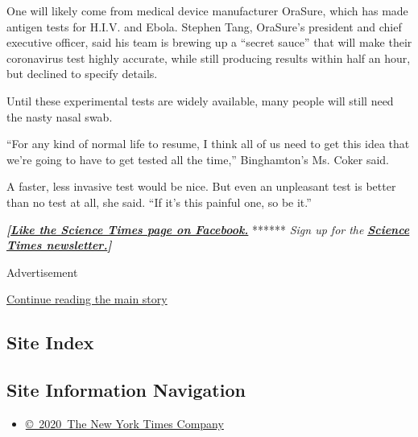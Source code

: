 One will likely come from medical device manufacturer OraSure, which has
made antigen tests for H.I.V. and Ebola. Stephen Tang, OraSure's
president and chief executive officer, said his team is brewing up a
``secret sauce'' that will make their coronavirus test highly accurate,
while still producing results within half an hour, but declined to
specify details.

Until these experimental tests are widely available, many people will
still need the nasty nasal swab.

``For any kind of normal life to resume, I think all of us need to get
this idea that we're going to have to get tested all the time,''
Binghamton's Ms. Coker said.

A faster, less invasive test would be nice. But even an unpleasant test
is better than no test at all, she said. ``If it's this painful one, so
be it.''

\textbf{\emph{{[}}\href{http://on.fb.me/1paTQ1h}{\emph{Like the Science
Times page on Facebook.}}} ****** \emph{\textbar{} Sign up for the}
\textbf{\href{http://nyti.ms/1MbHaRU}{\emph{Science Times
newsletter.}}\emph{{]}}}

Advertisement

\protect\hyperlink{after-bottom}{Continue reading the main story}

\hypertarget{site-index}{%
\subsection{Site Index}\label{site-index}}

\hypertarget{site-information-navigation}{%
\subsection{Site Information
Navigation}\label{site-information-navigation}}

\begin{itemize}
\tightlist
\item
  \href{https://help.nytimes3xbfgragh.onion/hc/en-us/articles/115014792127-Copyright-notice}{©~2020~The
  New York Times Company}
\end{itemize}

